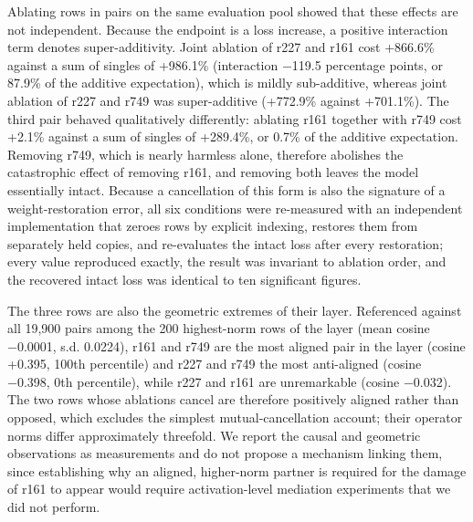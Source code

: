 \documentclass[11pt]{article}
\begin{document}
Ablating rows in pairs on the same evaluation pool showed that these effects are not independent. Because the endpoint is a loss increase, a positive interaction term denotes super-additivity. Joint ablation of r227 and r161 cost +866.6\% against a sum of singles of +986.1\% (interaction −119.5 percentage points, or 87.9\% of the additive expectation), which is mildly sub-additive, whereas joint ablation of r227 and r749 was super-additive (+772.9\% against +701.1\%). The third pair behaved qualitatively differently: ablating r161 together with r749 cost +2.1\% against a sum of singles of +289.4\%, or 0.7\% of the additive expectation. Removing r749, which is nearly harmless alone, therefore abolishes the catastrophic effect of removing r161, and removing both leaves the model essentially intact. Because a cancellation of this form is also the signature of a weight-restoration error, all six conditions were re-measured with an independent implementation that zeroes rows by explicit indexing, restores them from separately held copies, and re-evaluates the intact loss after every restoration; every value reproduced exactly, the result was invariant to ablation order, and the recovered intact loss was identical to ten significant figures.

The three rows are also the geometric extremes of their layer. Referenced against all 19,900 pairs among the 200 highest-norm rows of the layer (mean cosine −0.0001, s.d. 0.0224), r161 and r749 are the most aligned pair in the layer (cosine +0.395, 100th percentile) and r227 and r749 the most anti-aligned (cosine −0.398, 0th percentile), while r227 and r161 are unremarkable (cosine −0.032). The two rows whose ablations cancel are therefore positively aligned rather than opposed, which excludes the simplest mutual-cancellation account; their operator norms differ approximately threefold. We report the causal and geometric observations as measurements and do not propose a mechanism linking them, since establishing why an aligned, higher-norm partner is required for the damage of r161 to appear would require activation-level mediation experiments that we did not perform.
\end{document}
